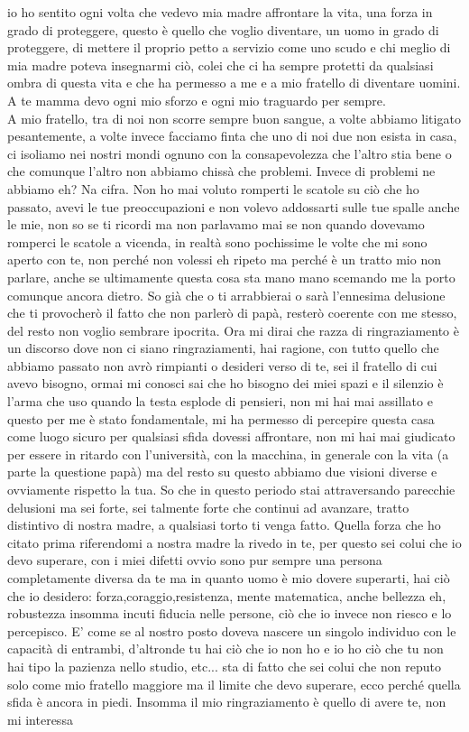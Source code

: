 io ho sentito ogni volta che vedevo mia madre affrontare la vita, una forza in grado di proteggere, questo è quello che voglio diventare, un uomo in grado di proteggere, di mettere il proprio petto a servizio come uno scudo e chi meglio di mia madre poteva insegnarmi ciò, colei che ci ha sempre protetti da qualsiasi ombra di questa vita e che ha permesso a me e a mio fratello di diventare uomini. A te mamma devo ogni mio sforzo e ogni mio traguardo per sempre.\\

A mio fratello, tra di noi non scorre sempre buon sangue, a volte abbiamo litigato pesantemente, a volte invece facciamo finta che uno di noi due non esista in casa, ci isoliamo nei nostri mondi ognuno con la consapevolezza che l'altro stia bene o che comunque l'altro non abbiamo chissà che problemi. Invece di problemi ne abbiamo eh? Na cifra. Non ho mai voluto romperti le scatole su ciò che ho passato, avevi le tue preoccupazioni e non volevo addossarti sulle tue spalle anche le mie, non so se ti ricordi ma non parlavamo mai se non quando dovevamo romperci le scatole a vicenda, in realtà sono pochissime le volte che mi sono aperto con te, non perché non volessi eh ripeto ma perché è un tratto mio non parlare, anche se ultimamente questa cosa sta mano mano scemando me la porto comunque ancora dietro. So già che o ti arrabbierai o sarà l'ennesima delusione che ti provocherò il fatto che non parlerò di papà, resterò coerente con me stesso, del resto non voglio sembrare ipocrita. Ora mi dirai che razza di ringraziamento è un discorso dove non ci siano ringraziamenti, hai ragione, con tutto quello che abbiamo passato non avrò rimpianti o desideri verso di te, sei il fratello di cui avevo bisogno, ormai mi conosci sai che ho bisogno dei miei spazi e il silenzio è l'arma che uso quando la testa esplode di pensieri, non mi hai mai assillato e questo per me è stato fondamentale, mi ha permesso di percepire questa casa come luogo sicuro per qualsiasi sfida dovessi affrontare, non mi hai mai giudicato per essere in ritardo con l'università, con la macchina, in generale con la vita (a parte la questione papà) ma del resto su questo abbiamo due visioni diverse e ovviamente rispetto la tua. So che in questo periodo stai attraversando parecchie delusioni ma sei forte, sei talmente forte che continui ad avanzare, tratto distintivo di nostra madre, a qualsiasi torto ti venga fatto. Quella forza che ho citato prima riferendomi a nostra madre la rivedo in te, per questo sei colui che io devo superare, con i miei difetti ovvio sono pur sempre una persona completamente diversa da te ma in quanto uomo è mio dovere superarti, hai ciò che io desidero: forza,coraggio,resistenza, mente matematica, anche bellezza eh, robustezza insomma incuti fiducia nelle persone, ciò che io invece non riesco e lo percepisco. E' come se al nostro posto doveva nascere un singolo individuo con le capacità di entrambi, d'altronde tu hai ciò che io non ho e io ho ciò che tu non hai tipo la pazienza nello studio, etc... sta di fatto che sei colui che non reputo solo come mio fratello maggiore ma il limite che devo superare, ecco perché quella sfida è ancora in piedi. Insomma il mio ringraziamento è quello di avere te, non mi interessa 